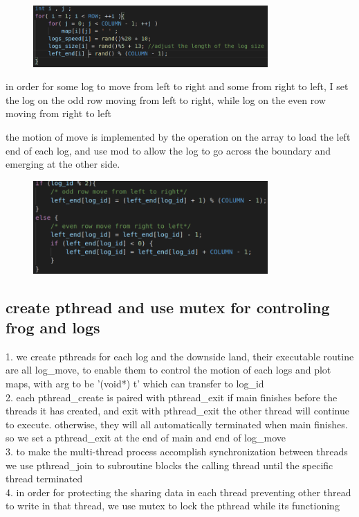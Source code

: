 \documentclass{article}
\begin{document}
\begin{figure}[htbp]
    \centering
    \includegraphics[width = 0.8\textwidth]{logset.png}
\end{figure}

in order for some log to move from left to right and some from right to left, I set the log on the odd row moving from left to right, while log on the even row moving from right to left

the motion of move is implemented by the operation on the array to load the left end of each log, and use mod to allow the log to go across the boundary and emerging at the other side.


\begin{figure}[htbp]
    \centering
    \includegraphics[width = 0.8\textwidth]{logmove.png}
\end{figure}

\subsection{create pthread and use mutex for controling frog and logs}
1. we create pthreads for each log and the downside land, their executable routine are all log\_move, to enable them to control the motion of each logs and plot maps, with arg to be '(void*) t' which can transfer to log\_id
\\
2. each pthread\_create is paired with pthread\_exit if main finishes before the threads it has created, and exit with pthread\_exit\(\) the other thread will continue to execute. otherwise, they will all automatically terminated when main finishes.
so we set a pthread\_exit at the end of main and end of log\_move
\\
3. to make the multi-thread process accomplish synchronization between threads we use pthread\_join to subroutine blocks the calling thread until the specific thread terminated 
\\
4. in order for protecting the sharing data in each thread preventing other thread to write in that thread, we use mutex to lock the pthread while its functioning
\end{document}

